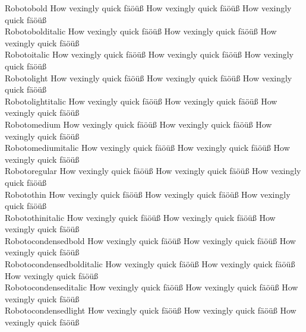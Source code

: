 \begin{tabbing}
Robotobold \> {\mktsStyleNormal{}How vexingly quick fäöüß} {\Robotobold{}How vexingly quick fäöüß} {\mktsStyleItalic{}How vexingly quick fäöüß} \\
Robotobolditalic \> {\mktsStyleNormal{}How vexingly quick fäöüß} {\Robotobolditalic{}How vexingly quick fäöüß} {\mktsStyleItalic{}How vexingly quick fäöüß} \\
Robotoitalic \> {\mktsStyleNormal{}How vexingly quick fäöüß} {\Robotoitalic{}How vexingly quick fäöüß} {\mktsStyleItalic{}How vexingly quick fäöüß} \\
Robotolight \> {\mktsStyleNormal{}How vexingly quick fäöüß} {\Robotolight{}How vexingly quick fäöüß} {\mktsStyleItalic{}How vexingly quick fäöüß} \\
Robotolightitalic \> {\mktsStyleNormal{}How vexingly quick fäöüß} {\Robotolightitalic{}How vexingly quick fäöüß} {\mktsStyleItalic{}How vexingly quick fäöüß} \\
Robotomedium \> {\mktsStyleNormal{}How vexingly quick fäöüß} {\Robotomedium{}How vexingly quick fäöüß} {\mktsStyleItalic{}How vexingly quick fäöüß} \\
Robotomediumitalic \> {\mktsStyleNormal{}How vexingly quick fäöüß} {\Robotomediumitalic{}How vexingly quick fäöüß} {\mktsStyleItalic{}How vexingly quick fäöüß} \\
Robotoregular \> {\mktsStyleNormal{}How vexingly quick fäöüß} {\Robotoregular{}How vexingly quick fäöüß} {\mktsStyleItalic{}How vexingly quick fäöüß} \\
Robotothin \> {\mktsStyleNormal{}How vexingly quick fäöüß} {\Robotothin{}How vexingly quick fäöüß} {\mktsStyleItalic{}How vexingly quick fäöüß} \\
Robotothinitalic \> {\mktsStyleNormal{}How vexingly quick fäöüß} {\Robotothinitalic{}How vexingly quick fäöüß} {\mktsStyleItalic{}How vexingly quick fäöüß} \\
Robotocondensedbold \> {\mktsStyleNormal{}How vexingly quick fäöüß} {\Robotocondensedbold{}How vexingly quick fäöüß} {\mktsStyleItalic{}How vexingly quick fäöüß} \\
Robotocondensedbolditalic \> {\mktsStyleNormal{}How vexingly quick fäöüß} {\Robotocondensedbolditalic{}How vexingly quick fäöüß} {\mktsStyleItalic{}How vexingly quick fäöüß} \\
Robotocondenseditalic \> {\mktsStyleNormal{}How vexingly quick fäöüß} {\Robotocondenseditalic{}How vexingly quick fäöüß} {\mktsStyleItalic{}How vexingly quick fäöüß} \\
Robotocondensedlight \> {\mktsStyleNormal{}How vexingly quick fäöüß} {\Robotocondensedlight{}How vexingly quick fäöüß} {\mktsStyleItalic{}How vexingly quick fäöüß} \\

\end{tabbing}
